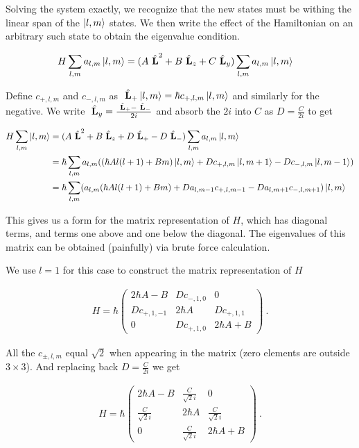 \question

Solving the system exactly, we recognize that the new states must be withing the
linear span of the $\ket{l, m}$ states. We then write the effect of the
Hamiltonian on an arbitrary such state to obtain the eigenvalue condition.

\begin{align}
    H \sum_{l, m}a_{l, m}\ket{l, m} &= (A ~\hat{\textbf{L}}^2 + B~\hat{\textbf{L}}_z + C~\hat{\textbf{L}}_y) \sum_{l, m}a_{l, m}\ket{l, m}
\end{align}

Define $c_{+, l,m}$ and $c_{-, l,m}$ as $~\hat{\textbf{L}}_+ \ket{l, m} = \hbar c_{+,
l,m} \ket{l, m}$ and similarly for the negative. We write $~\hat{\textbf{L}}_y =
\frac{~\hat{\textbf{L}}_+ - ~\hat{\textbf{L}}_-}{2i}$ and absorb the $2i$ into
$C$ as $D = \frac{C}{2i}$ to get

\begin{align}
    H \sum_{l, m}\ket{l, m} &= 
    (A ~\hat{\textbf{L}}^2 + B~\hat{\textbf{L}}_z + 
    D~\hat{\textbf{L}}_+ - D~\hat{\textbf{L}}_-) \sum_{l, m}a_{l, m}\ket{l, m}\nonumber\\
    &= \hbar \sum_{l, m}a_{l, m}((\hbar A l(l+1) + Bm)\ket{l, m} + Dc_{+, l,m}\ket{l, m+1} - Dc_{-, l,m}\ket{l, m-1}) \nonumber\\
    &= \hbar \sum_{l, m}(a_{l, m}(\hbar A l(l+1) + Bm) + Da_{l, m-1}c_{+, l,m-1} - Da_{l, m+1}c_{-, l,m+1})\ket{l, m} \\
\end{align}

This gives us a form for the matrix representation of $H$, which has diagonal
terms, and terms one above and one below the diagonal. The eigenvalues of this
matrix can be obtained (painfully) via brute force calculation.

We use $l = 1$ for this case to construct the matrix representation of $H$

\begin{align}
    H = \hbar \begin{pmatrix}
        2\hbar A - B    & Dc_{-, 1,0}       & 0             \\   
        Dc_{+, 1,-1}    & 2\hbar A          & Dc_{+, 1,1}   \\   
        0               & Dc_{+, 1,0}       & 2\hbar A + B    
    \end{pmatrix}~.
\end{align}

All the $c_{\pm, l,m}$ equal $\sqrt{2}$ when appearing in the matrix (zero
elements are outside $3\times 3$). And replacing back $D = \frac{C}{2i}$ we get

\begin{align}
    H = \hbar \begin{pmatrix}
        2\hbar A - B        & \frac{C}{\sqrt{2}i}       & 0                     \\   
        \frac{C}{\sqrt{2}i} & 2\hbar A                  & \frac{C}{\sqrt{2}i}   \\   
        0                   & \frac{C}{\sqrt{2}i}       & 2\hbar A + B    
    \end{pmatrix}~.
\end{align}